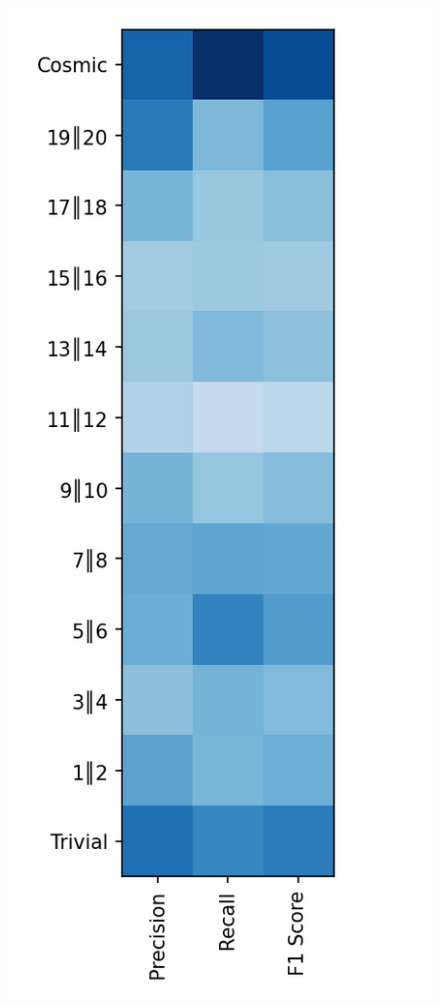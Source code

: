 \documentclass{article}
\begin{document}
\begin{figure}[ht]
		\begin{minipage}[b]{0.32\linewidth}
			\centering
			\includegraphics[width=\linewidth]{12 - K Nearest Neighbors.png} 

\end{minipage}
\end{figure}
\end{document}
